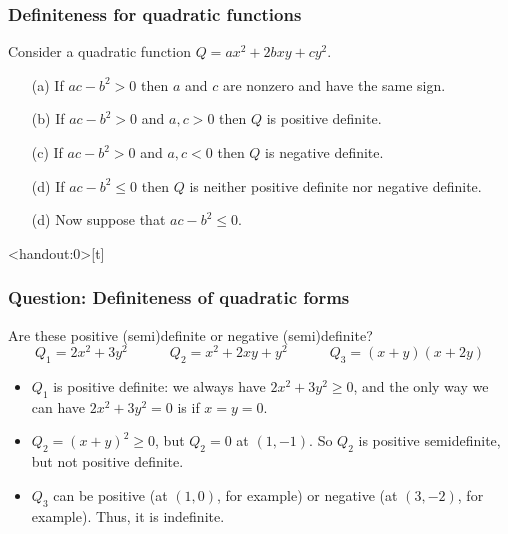 \documentclass[9pt]{beamer}
\begin{document}
\begin{frame}[t]
 \frametitle{Definiteness for quadratic functions}
 
 Consider a quadratic function $Q=ax^2+2bxy+cy^2$.
 \begin{itemize}
  \item[(a)] If $ac-b^2>0$ then $a$ and $c$ are nonzero and have the same sign.
  \item[(b)] If $ac-b^2>0$ and $a,c>0$ then $Q$ is positive definite.
  \item[(c)] If $ac-b^2>0$ and $a,c<0$ then $Q$ is negative definite.
  \item[(d)] If $ac-b^2\leq 0$ then $Q$ is neither positive definite nor negative definite.
 \end{itemize}

 \medskip

 {\Large {}}
 \begin{itemize}
  \item[(d)] Now suppose that $ac-b^2\leq 0$.
 \end{itemize}
\end{frame}

\begin{frame}<handout:0>[t]
 \frametitle{Question: Definiteness of quadratic forms}
 Are these positive (semi)definite or negative (semi)definite?
 \[ Q_1 = 2x^2 + 3y^2 \hspace{3em}
    Q_2 = x^2+2xy+y^2 \hspace{3em}
    Q_3 = (x+y)(x+2y)
 \]

 \begin{itemize}
  \item<2-> $Q_1$ is positive definite: we always have
   $2x^2+3y^2\geq 0$, and the only way we can have $2x^2+3y^2=0$ is if
   $x=y=0$.
  \item<3-> $Q_2=(x+y)^2\geq 0$, but $Q_2=0$ at $(1,-1)$.  So $Q_2$ is
   positive semidefinite, but not positive definite.
  \item<4-> $Q_3$ can be positive (at $(1,0)$, for example) or
   negative (at $(3,-2)$, for example).  Thus, it is indefinite.
 \end{itemize}
\end{frame}
\end{document}
